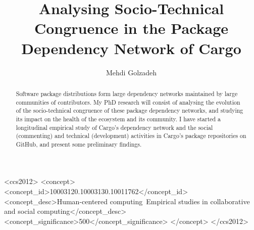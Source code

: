 \documentclass[sigconf,screen]{acmart}
\begin{document}
	
\title{Analysing Socio-Technical Congruence in the Package Dependency Network of Cargo}

	\author{Mehdi Golzadeh}
	
	\newcommand*{\Scale}[2][4]{\scalebox{#1}{$#2$}}%
	\newcommand{\Tool}{ComAir\xspace}
	\newcommand{\ComBugs}{30\xspace}
	
	
	
	
	
\begin{abstract}
Software package distributions form large dependency networks maintained by large communities of contributors. My PhD research will consist of analysing the evolution of the socio-technical congruence of these package dependency networks, and studying its impact on the health of the ecosystem and its community.
I have started a longitudinal empirical study of Cargo's dependency network and the social (commenting) and technical (development) activities in Cargo's package repositories on GitHub, and present some preliminary findings.
\end{abstract}


\begin{CCSXML}
<ccs2012>
	<concept>
		<concept_id>10003120.10003130.10011762</concept_id>
		<concept_desc>Human-centered computing~Empirical studies in collaborative and social computing</concept_desc>
		<concept_significance>500</concept_significance>
	</concept>
</ccs2012>
\end{CCSXML}
\end{document}
